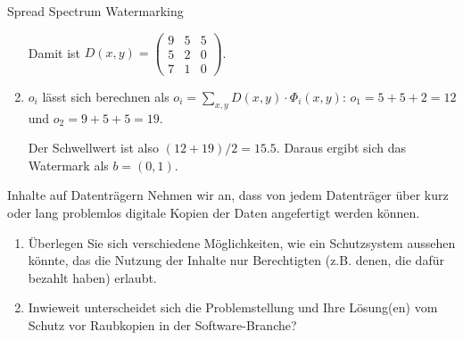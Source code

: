 \documentclass{article}
\begin{document}
\begin{exercise}[3]{Spread Spectrum Watermarking}
\begin{solution}
\begin{enumerate}
            Damit ist $D(x,y) = \begin{pmatrix} 9 & 5 & 5 \\ 5 & 2 & 0 \\ 7 & 1 & 0 \end{pmatrix}$.

      \item $o_i$ lässt sich berechnen als $o_i = \sum_{x,y}{D(x,y) \cdot \Phi_i(x,y)}$: $o_1 = 5+5+2 = 12$ und $o_2 = 9+5+5 = 19$.

            Der Schwellwert ist also $(12+19)/2 = 15.5$. Daraus ergibt sich das Watermark als $b = (0,1)$.
    \end{enumerate}
  \end{solution}
\end{exercise}

\setcounter{section}{25}
\begin{exercise}[1]{Inhalte auf Datenträgern}
  Nehmen wir an, dass von jedem Datenträger über kurz oder lang problemlos digitale Kopien der Daten angefertigt werden können.
  \begin{enumerate}
    \item Überlegen Sie sich verschiedene Möglichkeiten, wie ein Schutzsystem aussehen könnte, das die Nutzung der Inhalte nur Berechtigten (z.B. denen, die dafür bezahlt haben) erlaubt.
    \item Inwieweit unterscheidet sich die Problemstellung und Ihre Lösung(en) vom Schutz vor Raubkopien in der Software-Branche?
  \end{enumerate}


\end{exercise}
\end{document}
